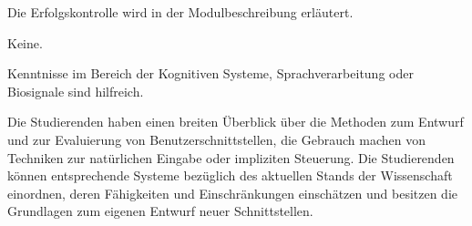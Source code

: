 \begin{course}

\setdoclanguagegerman
{}



\coursehead


\label{cour_10777.dp_997}


\begin{styleenv}
\begin{assessment}
Die Erfolgskontrolle wird in der Modulbeschreibung erläutert.


\end{assessment}

\begin{conditions}Keine.\end{conditions}

\begin{recommendations}Kenntnisse im Bereich der Kognitiven Systeme, Sprachverarbeitung oder Biosignale sind hilfreich.

\end{recommendations}
\end{styleenv}

\begin{learningoutcomes}
Die Studierenden haben einen breiten Überblick über die Methoden zum Entwurf und zur Evaluierung von Benutzerschnittstellen, die Gebrauch machen von Techniken zur natürlichen Eingabe oder impliziten Steuerung. Die Studierenden können entsprechende Systeme bezüglich des aktuellen Stands der Wissenschaft einordnen, deren Fähigkeiten und Einschränkungen einschätzen und besitzen die Grundlagen zum eigenen Entwurf neuer Schnittstellen.


\end{learningoutcomes}


\end{course}
